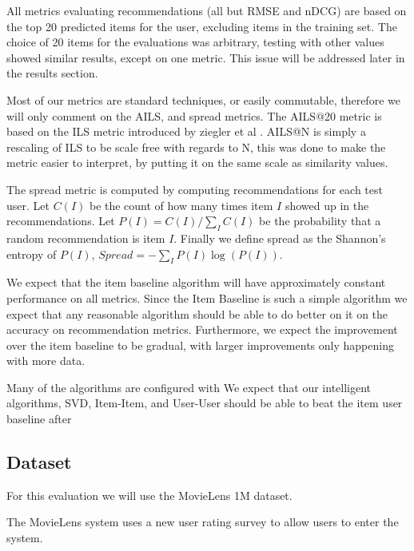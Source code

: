 \documentclass[letterpaper]{sig-alternate}
\begin{document}
  All metrics evaluating recommendations (all but RMSE and nDCG) are based on the top 20 predicted items for the user, excluding items in the training set.
  The choice of 20 items for the evaluations was arbitrary, testing with other values showed similar results, except on one metric.
  This issue will be addressed later in the results section.
  
  Most of our metrics are standard techniques, or easily commutable, therefore we will only comment on the AILS, and spread metrics.
  The AILS@20 metric is based on the ILS metric introduced by ziegler et al \cite{ziegler}.
  AILS@N is simply a rescaling of ILS to be scale free with regards to N, this was done to make the metric easier to interpret, by putting it on the same scale as similarity values.
 
  The spread metric is computed by computing recommendations for each test user.
  Let $C(I)$ be the count of how many times item $I$ showed up in the recommendations.
  Let $P(I) = C(I) / \sum_I C(I)$ be the probability that a random recommendation is item $I$.
  Finally we define spread as the Shannon's entropy of $P(I)$, $Spread = -\sum_I P(I) \log(P(I))$.

  We expect that the item baseline algorithm will have approximately constant performance on all metrics.
  Since the Item Baseline is such a simple algorithm we expect that any reasonable algorithm should be able to do better on it on the accuracy on recommendation metrics.
  Furthermore, we expect the improvement over the item baseline to be gradual, with larger improvements only happening with more data.
  
  Many of the algorithms are configured with 
  We expect that our intelligent algorithms, SVD, Item-Item, and User-User should be able to beat the item user baseline after 
  
  \subsection*{Dataset}
  For this evaluation we will use the MovieLens 1M dataset.

  The MovieLens system uses a new user rating survey to allow users to enter the system.
  
\end{document}
